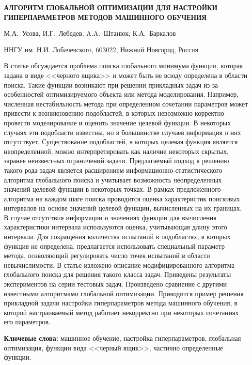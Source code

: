 \documentclass[a4paper,12pt,russian]{article}
\begin{document}
\begin{center}
	\textbf{АЛГОРИТМ ГЛОБАЛЬНОЙ ОПТИМИЗАЦИИ ДЛЯ НАСТРОЙКИ ГИПЕРПАРАМЕТРОВ МЕТОДОВ МАШИННОГО ОБУЧЕНИЯ}
\end{center}

\begin{center}
	{М.А.~Усова, И.Г.~Лебедев, A.A.~Штанюк, К.А.~Баркалов }
\end{center}

\begin{center}
{ННГУ им. Н.И. Лобачевского, 603022, Нижний Новгород, Россия}
\end{center}

\newline
\begin{small}
В статье обсуждается проблема поиска глобального минимума функции, которая задана в виде <<черного ящика>> и может быть не всюду определена в области поиска. Такие функции возникают при решении прикладных задач из-за особенностей оптимизируемого объекта или метода моделирования. Например, численная нестабильность метода при определенном сочетании параметров может привести к возникновению подобластей, в которых невозможно корректно провести моделирование и оценить значение целевой функции. В некоторых случаях эти подобласти известны, но в большинстве случаев информация о них отсутствует. Существование подобластей, в которых целевая функция является неопределенной, можно интерпретировать как наличие некоторых скрытых, заранее неизвестных ограничений задачи. Предлагаемый подход к решению такого рода задач является расширением информационно-статистического алгоритма глобального поиска и учитывает возможность неопределенных значений целевой функции в некоторых точках. 
В рамках предложенного алгоритма на каждом шаге поиска проводится оценка характеристик поисковых интервалов на основе значений целевой функции, вычисленных на их границах. 
В случае отсутствия информации о значениях функции для вычисления характеристики интервала используются оценка, учитывающая длину этого интервала. Для сокращения количества испытаний в подобластях, в которых функция не определена, предлагается использовать специальный параметр метода, позволяющий регулировать число точек испытаний в области невычислимости. В статье изложено описание модифицированного алгоритма глобального поиска для решения такого класса задач. Приведены результаты экспериментов на серии тестовых задач. Произведено сравнение с другими известными алгоритмами глобальной оптимизации. Приводится пример решения прикладной задачи настройки гиперпараметров метода машинного обучения, в которой настраиваемый метод работает некорректно при некоторых сочетаниях его параметров.


\textbf{Ключевые слова:} машинное обучение, настройка гиперпараметров, глобальная оптимизация, функции вида <<черный ящик>>, частично определенные функции.
\end{small}
\end{document}
